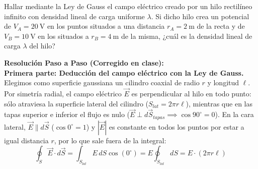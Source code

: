 \begin{ejercicio}
Hallar mediante la Ley de Gauss el campo eléctrico creado por un hilo rectilíneo infinito con densidad lineal de carga uniforme $\lambda$. Si dicho hilo crea un potencial de $V_A = 20\ \si{\volt}$ en los puntos situados a una distancia $r_A = 2\ \si{\meter}$ de la recta y de $V_B = 10\ \si{\volt}$ en los situados a $r_B = 4\ \si{\meter}$ de la misma, ¿cuál es la densidad lineal de carga $\lambda$ del hilo?
\tcbline
\begin{center}
\end{center}
\textbf{Resolución Paso a Paso (Corregido en clase):}\\[4pt]
\textbf{Primera parte: Deducción del campo eléctrico con la Ley de Gauss.}
Elegimos como superficie gaussiana un cilindro coaxial de radio $r$ y longitud $\ell$. Por simetría radial, el campo eléctrico $\vec{E}$ es perpendicular al hilo en todo punto: sólo atraviesa la superficie lateral del cilindro ($S_{lat} = 2\pi r \ell$), mientras que en las tapas superior e inferior el flujo es nulo ($\vec{E} \perp d\vec{S}_{tapas} \implies \cos 90^\circ = 0$). En la cara lateral, $\vec{E} \parallel d\vec{S}$ ($\cos 0^\circ = 1$) y $|\vec{E}|$ es constante en todos los puntos por estar a igual distancia $r$, por lo que sale fuera de la integral:
\begin{equation}
    \oint_S \vec{E} \cdot d\vec{S} = \int_{S_{lat}} E\, dS \cos(0^\circ) = E \oint_{S_{lat}} dS = E \cdot (2\pi r \ell)

\end{equation}
\end{ejercicio}
